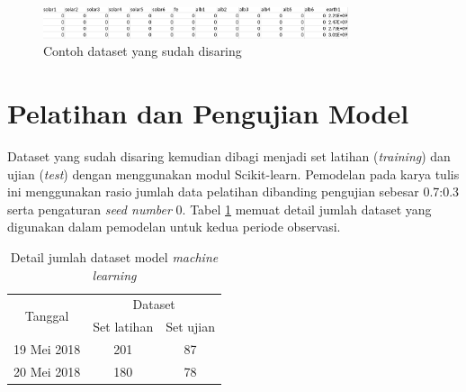\begin{figure}[H]
\setlength{}
\begin{center}
\includegraphics[width=0.8\textwidth]{fig/cleandataset.png}
\caption{Contoh dataset yang sudah disaring}
\label{fig:cleandataset}
\end{center}
\end{figure}


\section{Pelatihan dan Pengujian Model}

Dataset yang sudah disaring kemudian dibagi menjadi set latihan
(\textit{training}) dan ujian (\textit{test}) dengan menggunakan modul
Scikit-learn. Pemodelan pada karya tulis ini menggunakan rasio jumlah data
pelatihan dibanding pengujian sebesar 0.7:0.3 serta pengaturan \textit{seed
number} 0. Tabel \ref{table:dataset} memuat detail jumlah dataset yang
digunakan dalam pemodelan untuk kedua periode observasi.

\begin{table}[!ht]
\begin{center}
\caption{Detail jumlah dataset model \textit{machine learning}}
\label{table:dataset}
\begin{tabular}{|c|cc|}
\hline
\multirow{2}{*}{Tanggal} & \multicolumn{2}{c|}{Dataset}                 \\ \cline{2-3} 
                         & \multicolumn{1}{c|}{Set latihan} & Set ujian \\ \hline
19 Mei 2018              & \multicolumn{1}{c|}{201}         & 87        \\ \hline
20 Mei 2018              & \multicolumn{1}{c|}{180}         & 78        \\ \hline
\end{tabular}
\end{center}
\vspace{-5mm}
\end{table}
